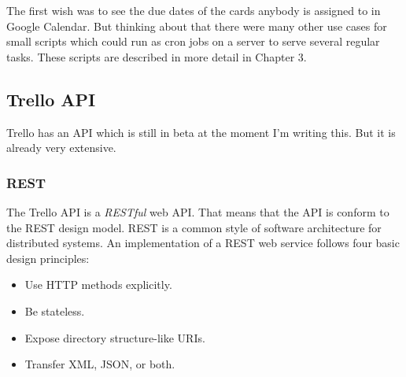 The first wish was to see the due dates of the cards anybody is assigned to in Google Calendar. But thinking about that there were many other use cases for small scripts which could run as cron jobs on a server to serve several regular tasks. These scripts are described in more detail in Chapter 3.

\subsection{Trello API}
Trello has an API  which is still in beta at the moment I'm writing this. But it is already very extensive. \cite{trello:docu}

\subsubsection{REST}
The Trello API is a \emph{RESTful} web API. That means that the API is conform to the REST design model. REST is a common style of software architecture for distributed systems. An implementation of a REST web service follows four basic design principles:
\begin{itemize}
	\item Use HTTP methods explicitly.
	\item Be stateless.
	\item Expose directory structure-like URIs.
	\item Transfer XML, JSON, or both.
\end{itemize}

\cite{rest}

